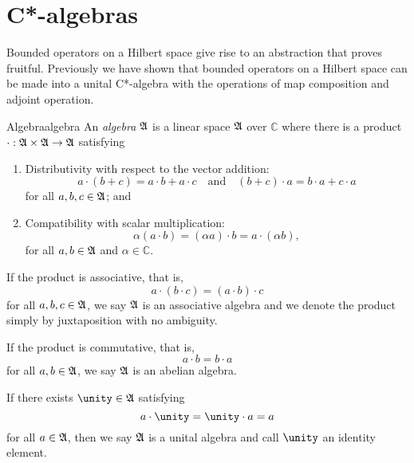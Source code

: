 \chapter{C*-algebras}
Bounded operators on a Hilbert space give rise to an abstraction that proves fruitful. Previously we have shown that bounded operators on a Hilbert space can be made into a unital C*-algebra with the operations of map composition and adjoint operation.
\begin{definition}{Algebra}{algebra}
    An \emph{algebra} \(\mathfrak{A}\) is a linear space \(\mathfrak{A}\) over \(\mathbb{C}\) where there is a product \(\cdot : \mathfrak{A} \times \mathfrak{A} \to \mathfrak{A}\) satisfying
\begin{enumerate}[label=(\alph*)]
    \item Distributivity with respect to the vector addition:
        \begin{equation*}
            a\cdot(b + c) = a\cdot b + a\cdot c
            \quad\text{and}\quad
            (b + c) \cdot a = b \cdot a + c \cdot a
        \end{equation*}
        for all \(a, b, c \in \mathfrak{A}\); and
    \item Compatibility with scalar multiplication:
        \begin{equation*}
            \alpha(a \cdot b) = (\alpha a)\cdot b = a \cdot (\alpha b),
        \end{equation*}
        for all \(a, b \in \mathfrak{A}\) and \(\alpha \in \mathbb{C}\).
\end{enumerate}
If the product is associative, that is,
\begin{equation*}
    a \cdot (b \cdot c) = (a \cdot b) \cdot c
\end{equation*}
for all \(a, b, c \in \mathfrak{A}\), we say \(\mathfrak{A}\) is an associative algebra and we denote the product simply by juxtaposition with no ambiguity.

If the product is commutative, that is,
\begin{equation*}
    a \cdot b = b \cdot a
\end{equation*}
for all \(a, b \in \mathfrak{A}\), we say \(\mathfrak{A}\) is an abelian algebra.

If there exists \(\unity \in \algebra{A}\) satisfying
\begin{equation*}
    a \cdot \unity = \unity \cdot a = a
\end{equation*}
for all \(a \in \mathfrak{A}\), then we say \(\mathfrak{A}\) is a unital algebra and call \(\unity\) an identity element.
\end{definition}

